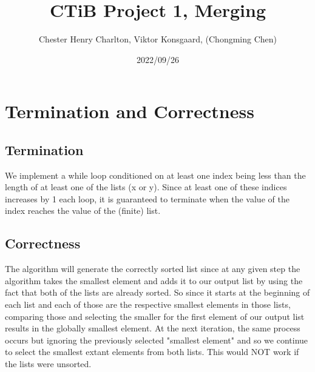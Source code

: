 \documentclass{article}
\title{CTiB Project 1, Merging}
\author{Chester Henry Charlton, Viktor Konsgaard, (Chongming Chen)}
\date{2022/09/26}
\begin{document}
\maketitle

\section{Termination and Correctness}
\subsection*{Termination}
    We implement a while loop conditioned on at least one
    index being less than the length of at least one of the lists (x or y). 
    Since at least one of these indices increases by 1 each loop, it is guaranteed
    to terminate when the value of the index reaches the value of the (finite) list. 

\subsection*{Correctness}
    The algorithm will generate the correctly sorted list since at any given step
    the algorithm takes the smallest element and adds it to our output list by 
    using the fact that both of the lists are already sorted. So since it starts
    at the beginning of each list and each of those are the respective smallest 
    elements in those lists, comparing those and selecting the smaller for the first 
    element of our output list results in the globally smallest element. At the next 
    iteration, the same process occurs but ignoring the previously selected "smallest 
    element" and so we continue to select the smallest extant elements from both lists. This would NOT work if the lists were unsorted.
\end{document}
